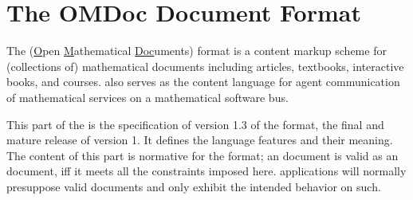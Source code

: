 
\part{The OMDoc Document Format}\label{part:specification}
  The {\omdoc} (\underline{O}pen \underline{M}athematical \underline{Doc}uments) format is
  a content markup scheme for (collections of) mathematical documents including articles,
  textbooks, interactive books, and courses.  {\omdoc} also serves as the content language
  for agent communication of mathematical services on a mathematical software bus.

  This part of the {\report} is the specification of version 1.3 of the {\omdoc} format,
  the final and mature release of {\omdoc} version 1. It defines the {\omdoc} language
  features and their meaning. The content of this part is normative for the {\omdoc}
  format; an {\omdoc} document is valid as an {\omdoc} document, iff it meets all the
  constraints imposed here. {\omdoc} applications will normally presuppose valid {\omdoc}
  documents and only exhibit the intended behavior on such.





